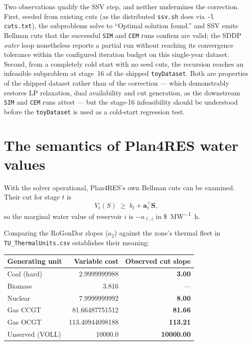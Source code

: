 \documentclass[12pt,a4paper]{article}
\begin{document}
Two observations qualify the SSV step, and neither undermines the correction.
First, seeded from existing cuts (as the distributed \texttt{ssv.sh} does via
\texttt{-l cuts.txt}), the subproblems solve to ``Optimal solution found.'' and
SSV emits Bellman cuts that the successful \texttt{SIM} and \texttt{CEM} runs
confirm are valid; the SDDP \emph{outer} loop nonetheless reports a partial run
without reaching its convergence tolerance within the configured iteration
budget on this single-year dataset. Second, from a completely cold start with
no seed cuts, the recursion reaches an infeasible subproblem at stage~16 of the
shipped \texttt{toyDataset}. Both are properties of the shipped dataset rather
than of the correction --- which demonstrably restores LP relaxation, dual
availability and cut generation, as the downstream \texttt{SIM} and \texttt{CEM}
runs attest --- but the stage-16 infeasibility should be understood before the
\texttt{toyDataset} is used as a cold-start regression test.

\section{The semantics of Plan4RES water values}
\label{sec:semantics}

With the solver operational, Plan4RES's own Bellman cuts can be examined. Their
cut for stage $t$ is
\begin{equation}
V_t(S) \;\geq\; b_\ell + \mathbf{a}_\ell^{\top}\mathbf{S},
\end{equation}
so the marginal water value of reservoir $i$ is $-a_{\ell,i}$ in
\si{\$\per\mega\watt\hour}.

Comparing the RoGonDor slopes ($a_2$) against the zone's thermal fleet in
\texttt{TU\_ThermalUnits.csv} establishes their meaning:

\begin{center}
\begin{tabular}{lrr}
\toprule
\textbf{Generating unit} & \textbf{Variable cost} & \textbf{Observed cut slope} \\
\midrule
Coal (hard)      & 2.9999999988   & \textbf{3.00} \\
Biomass          & 3.816          & --- \\
Nuclear          & 7.9999999992   & \textbf{8.00} \\
Gas CCGT         & 81.66487751512 & \textbf{81.66} \\
Gas OCGT         & 113.40944098188& \textbf{113.21} \\
Unserved (VOLL)  & 10000.0        & \textbf{10000.00} \\
\bottomrule
\end{tabular}
\end{center}
\end{document}
